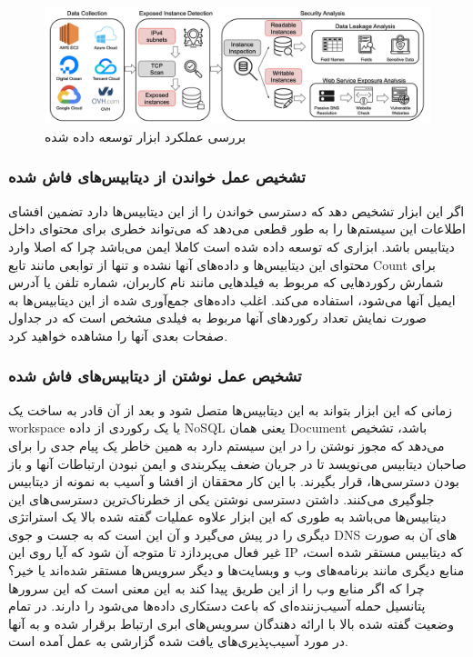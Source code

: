 \documentclass[10pt, a4paper]{article}
\begin{document}
\begin{figure}[H]
    \centering
    \includegraphics[width=1\textwidth]{res/fig1.png}
    \caption{بررسی عملکرد ابزار توسعه داده شده}
    \label{fig: diagram}
\end{figure}

\subsubsection{تشخیص عمل خواندن از دیتابیس‌های فاش شده}

اگر این ابزار تشخیص دهد که دسترسی خواندن را از این دیتابیس‌ها دارد تضمین افشای
اطلاعات این سیستم‌ها را به طور قطعی می‌دهد که می‌تواند خطری برای محتوای داخل
دیتابیس باشد. ابزاری که توسعه داده شده است کاملا ایمن می‌باشد چرا که اصلا وارد
محتوای این دیتابیس‌ها و داده‌های آنها نشده و تنها از توابعی مانند تابع Count
برای شمارش رکورد‌هایی که مربوط به فیلد‌هایی مانند نام کاربران، شماره تلفن یا
آدرس ایمیل آنها می‌شود، استفاده می‌کند. اغلب داده‌های جمع‌آوری شده از این
دیتابیس‌ها به صورت نمایش تعداد رکورد‌های آنها مربوط به فیلدی مشخص است که در
جداول صفحات بعدی آنها را مشاهده خواهید کرد.

\subsubsection{تشخیص عمل نوشتن از دیتابیس‌های فاش شده}

زمانی که این ابزار بتواند به این دیتابیس‌ها متصل شود و بعد از آن قادر به ساخت یک
workspace یا یک رکوردی از داده‌ NoSQL یعنی همان Document باشد، تشخیص می‌دهد که
مجوز نوشتن را در این سیستم دارد به همین خاطر یک پیام جدی را برای صاحبان دیتابیس
می‌نویسد تا در جریان ضعف پیکربندی و ایمن نبودن ارتباطات آنها و باز بودن
دسترسی‌ها، قرار بگیرند. با این کار محققان از افشا و آسیب به نمونه از دیتابیس
جلوگیری می‌کنند. داشتن دسترسی نوشتن یکی از خطرناک‌ترین دسترسی‌های این دیتابیس‌ها
می‌باشد به طوری که این ابزار علاوه عملیات گفته شده بالا یک استراتژی دیگری را در
پیش می‌گیرد و آن این است که به جست و جوی DNS های آن به صورت غیر فعال می‌پردازد
تا متوجه آن شود که آیا روی این IP که دیتابیس مستقر شده است، منابع دیگری مانند
برنامه‌های وب و وبسایت‌ها و دیگر سرویس‌ها مستقر شده‌اند یا خیر؟ چرا که اگر منابع
وب را از این طریق پیدا کند به این معنی است که این سرور‌ها پتانسیل حمله
آسیب‌زننده‌ای که باعث دستکاری داده‌ها می‌شود را دارند. در تمام وضعیت گفته شده
بالا با ارائه دهندگان سرویس‌های ابری ارتباط برقرار شده و به آنها در مورد
آسیب‌پذیری‌های یافت شده گزارشی به عمل آمده است.
\end{document}

